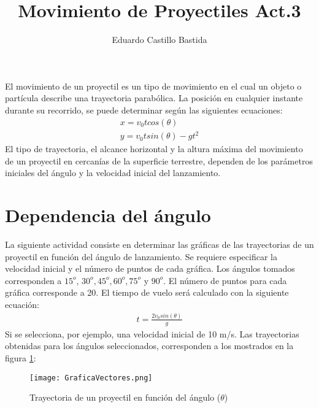 \documentclass[12pt,a4paper]{article}
\title{\textbf{Movimiento de Proyectiles Act.3}}
\author{Eduardo Castillo Bastida}
\begin{document}
\maketitle
El movimiento de un proyectil es un tipo de movimiento en el cual un objeto o partícula describe una trayectoria parabólica. La posición en cualquier instante durante su recorrido, se puede determinar según las siguientes ecuaciones:
\begin{eqnarray}
x=v_{0}tcos(\theta)\nonumber\\
y=v_{0}tsin(\theta)-gt^{2}
\end{eqnarray}
El tipo de trayectoria, el alcance horizontal y la altura máxima del movimiento de un proyectil en cercanías de la superficie terrestre, dependen de los parámetros iniciales del ángulo y la velocidad inicial del lanzamiento.
\section{Dependencia del ángulo}
La siguiente actividad consiste en determinar las gráficas de las trayectorias de un proyectil en función del ángulo de lanzamiento. Se requiere especificar la velocidad inicial y el número de puntos de cada gráfica. Los ángulos tomados corresponden a $15^{o}$, $30^{o}, 45^{o}, 60^{o}, 75^{o}$ y $90^{o}$. El número de puntos para cada gráfica  corresponde a 20. El tiempo de vuelo será calculado con  la siguiente ecuación:
\begin{eqnarray}
t=\frac{2v_{0}sin(\theta)}{g}
\end{eqnarray}
Si se selecciona, por ejemplo, una velocidad inicial de 10 m/s. Las trayectorias obtenidas para los ángulos seleccionados, corresponden a los mostrados en la figura \ref{fig:figura1}:
\begin{figure}
\centering
\texttt{[image: GraficaVectores.png]}
\caption{Trayectoria de un proyectil en función del ángulo ($\theta$)}\label{fig:figura1}
\end{figure}
\end{document}
